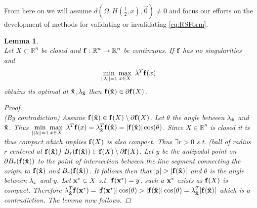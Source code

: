\documentclass[11pt]{article}
\theoremstyle{plain}
\newtheorem{lem}[thm]{Lemma}
\theoremstyle{definition}
\theoremstyle{remark}
\begin{document}
From here on we will assume $d(\Omega,H\left(\frac{1}{2},x\right),\vec{0})\neq 0$ and focus our efforts on the development of methods for validating or invalidating \ref{eq:RSForm}.\\



\begin{lem} \ \\
\label{lem:BdOpt}
Let $X\subset\mathbb{R}^n$ be closed and $\bold{f}:\mathbb{R}^n\rightarrow\mathbb{R}^n$ be continuous. If $\bold{f}$ has no singularities and $$\min\limits_{||\bold{\lambda}||=1}\max\limits_{x\in X}\ \bold{\lambda}^T\bold{f}(x)$$
obtains its optimal at $\bold{\hat{x}}$,$\bold{\lambda}_{\bold{\hat{x}}}$ then $\bold{f}(\bold{\hat{x}})\in \partial \bold{f}(X)$. 

\begin{proof} \ \\
(By contradiction) Assume $\bold{f}(\bold{\hat{x}})\in \bold{f}(X)\setminus\partial \bold{f}(X)$. Let $\theta$ the angle between $\bold{\lambda}_{\bold{\hat{x}}}$ and $\bold{\hat{x}}$. Thus $\min\limits_{||\bold{\lambda}||=1}\max\limits_{x\in X}\ \bold{\lambda}^T\bold{f}(x)=\bold{\lambda}_{\bold{\hat{x}}}^T\bold{f}(\bold{\hat{x}})=|\bold{f}(\bold{\hat{x}})|\cos(\theta)$. Since $X\in\mathbb{R}^n$ is closed it is thus compact which implies $\bold{f}(X)$ is also compact. Thus $\exists r>0$ s.t. (ball of radius $r$ centered at $\bold{f}(\bold{\hat{x}})$) $B_r(\bold{f}(\bold{\hat{x}}))\in \bold{f}(X)\setminus\partial \bold{f}(X)$. Let $y$ be the antipodal point on $\partial B_r(\bold{f}(\bold{\hat{x}}))$ to the point of intersection between the line segment connecting the origin to $\bold{f}(\bold{\hat{x}})$ and $B_r(\bold{f}(\bold{\hat{x}}))$. It follows then that $|y|>|\bold{f}(\bold{\hat{x}})|$ and $\theta$ is the angle between $\bold{\lambda}_x$ and $y$.   Let $\bold{x^*}\in X$ s.t. $\bold{f}(\bold{x^*})=y$, such a $\bold{x^*}$ exists as $\bold{f}(X)$ is compact. Therefore $\bold{\lambda}_{\bold{\hat{x}}}^T\bold{f}(\bold{x^*})=|\bold{f}(\bold{x^*})|\cos(\theta)>|\bold{f}(\bold{\hat{x}})|\cos(\theta)=\bold{\lambda}_{\bold{\hat{x}}}^T|\bold{f}(\bold{\hat{x}})|$ which is a contradiction. 
The lemma now follows.
\end{proof}
\end{lem}
\end{document}
